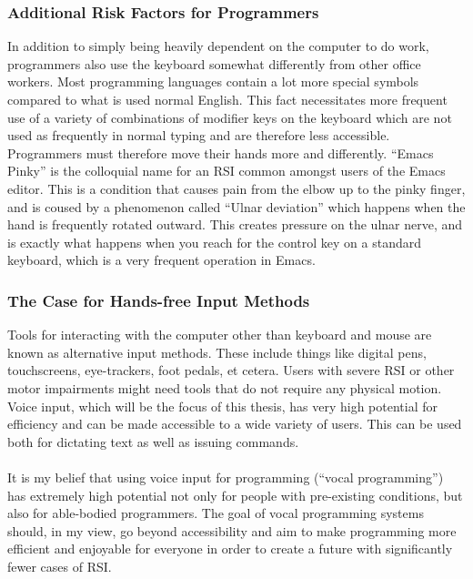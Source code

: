 \documentclass[../thesis.tex]{subfiles}
\begin{document}
\subsubsection{Additional Risk Factors for Programmers}
In addition to simply being heavily dependent on the computer to do work,
programmers also use the keyboard somewhat differently from other office workers.
Most programming languages contain a lot more special symbols compared to what is used
normal English.
This fact necessitates more frequent use of a variety of combinations of modifier keys on the keyboard
which are not used as frequently in normal typing and are therefore less accessible.
Programmers must therefore move their hands more and differently.
``Emacs Pinky'' is the colloquial name for an RSI common amongst users of the Emacs editor.
This is a condition that causes pain from the elbow up to the pinky finger, and is coused
by a phenomenon called ``Ulnar deviation'' which happens when the hand is frequently rotated
outward.
This creates pressure on the ulnar nerve, and is exactly what happens when you reach for the control key on a standard keyboard,
which is a very frequent operation in Emacs.

\subsubsection{The Case for Hands-free Input Methods}
Tools for interacting with the computer other than keyboard and mouse
are known as alternative input methods.
These include things like digital pens, touchscreens, eye-trackers, foot pedals, et cetera.
Users with severe RSI or other motor impairments might need tools that do not require any physical motion.
Voice input, which will be the focus of this thesis, has very high potential for efficiency and can be made accessible to a wide variety of users.
This can be used both for dictating text as well as issuing commands.
\paragraph{}
It is my belief that using voice input for programming (``vocal programming'')
has extremely high potential not only for people with pre-existing conditions, 
but also for able-bodied programmers.
The goal of vocal programming systems should, in my view, go beyond
accessibility and aim to make programming more efficient and enjoyable for everyone
in order to create a future with significantly fewer cases of RSI.
\end{document}
